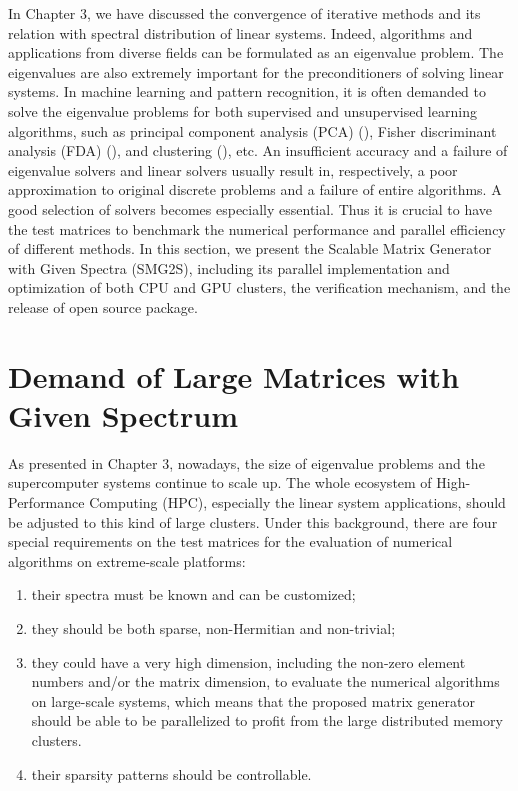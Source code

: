 \begin{displayquote}
	\textsf{In Chapter 3, we have discussed the convergence of iterative methods and its relation with spectral distribution of linear systems. Indeed, algorithms and applications from diverse fields can be formulated as an eigenvalue problem. The eigenvalues are also extremely important for the preconditioners of solving linear systems. In machine learning and pattern recognition, it is often demanded to solve the eigenvalue problems for both supervised and unsupervised learning algorithms, such as principal component analysis (PCA) (\cite{croux2000principal}), Fisher discriminant analysis (FDA) (\cite{berkes2005handwritten}), and clustering (\cite{fender2017parallel}), etc. An insufficient accuracy and a failure of eigenvalue solvers and linear solvers usually result in, respectively, a poor approximation to original discrete problems and a failure of entire algorithms.  A good selection of solvers becomes especially essential. Thus it is crucial to have the test matrices to benchmark the numerical performance and parallel efficiency of different methods. In this section, we present the Scalable Matrix Generator with Given Spectra (SMG2S), including its parallel implementation and optimization of both CPU and GPU clusters, the verification mechanism, and the release of open source package.}
\end{displayquote}

\vspace{0.6in}

\section{Demand of Large Matrices with Given Spectrum}

As presented in Chapter 3, nowadays, the size of eigenvalue problems and the supercomputer systems continue to scale up. The whole ecosystem of High-Performance Computing (HPC), especially the linear system applications, should be adjusted to this kind of large clusters. Under this background, there are four special requirements on the test matrices for the evaluation of numerical algorithms on extreme-scale platforms: 

\begin{enumerate}
	\item their spectra must be known and can be customized;
	\item they should be both sparse, non-Hermitian and non-trivial;
	\item they could have a very high dimension, including the non-zero element numbers and/or the matrix dimension, to evaluate the numerical algorithms on large-scale systems, which means that the proposed matrix generator should be able to be parallelized to profit from the large distributed memory clusters.
	\item their sparsity patterns should be controllable.
\end{enumerate}

